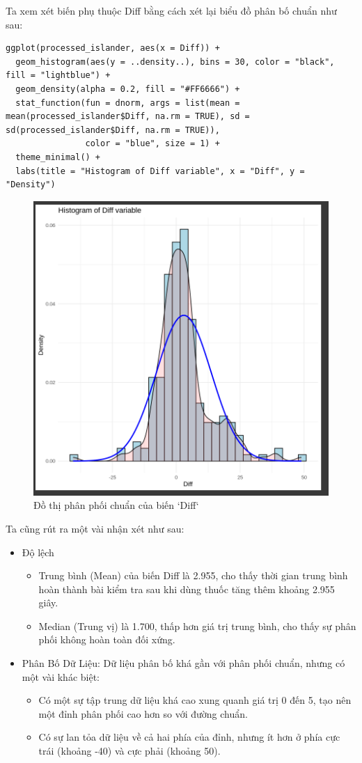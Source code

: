 \begin{itemize}
    Ta xem xét biến phụ thuộc Diff bằng cách xét lại biểu đồ phân bố chuẩn như sau:
    \begin{lstlisting}
ggplot(processed_islander, aes(x = Diff)) +
  geom_histogram(aes(y = ..density..), bins = 30, color = "black", fill = "lightblue") +
  geom_density(alpha = 0.2, fill = "#FF6666") +
  stat_function(fun = dnorm, args = list(mean = mean(processed_islander$Diff, na.rm = TRUE), sd = sd(processed_islander$Diff, na.rm = TRUE)),
                color = "blue", size = 1) +
  theme_minimal() +
  labs(title = "Histogram of Diff variable", x = "Diff", y = "Density")
    \end{lstlisting}
    \begin{figure}[H]
                \centering
                \includegraphics[width=0.8\linewidth]{part01_figures/2.png}
                \caption{Đồ thị phân phối chuẩn của biến `Diff`}
                \label{fig:Đồ thị phân phối chuẩn của biến `Diff`_}
            \end{figure}
    Ta cũng rút ra một vài nhận xét như sau:
    \begin{itemize}
        \item Độ lệch
        \begin{itemize}
            \item Trung bình (Mean) của biến Diff là 2.955, cho thấy thời gian trung bình hoàn thành bài kiểm tra sau khi dùng thuốc tăng thêm khoảng 2.955 giây.
            \item Median (Trung vị) là 1.700, thấp hơn giá trị trung bình, cho thấy sự phân phối không hoàn toàn đối xứng.
        \end{itemize}
        \item Phân Bố Dữ Liệu: Dữ liệu phân bố khá gần với phân phối chuẩn, nhưng có một vài khác biệt:
        \begin{itemize}
            \item Có một sự tập trung dữ liệu khá cao xung quanh giá trị 0 đến 5, tạo nên một đỉnh phân phối cao hơn so với đường chuẩn.
            \item Có sự lan tỏa dữ liệu về cả hai phía của đỉnh, nhưng ít hơn ở phía cực trái (khoảng -40) và cực phải (khoảng 50).
        \end{itemize}


\end{itemize}
\end{itemize}
